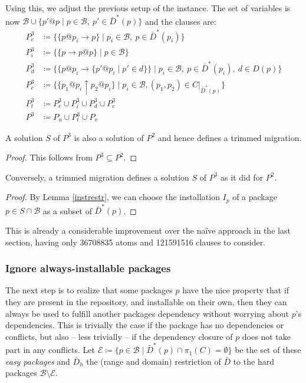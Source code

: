 \documentclass[halfparskip,11pt]{scrartcl}
\begin{document}
Using this, we adjust the previous setup of the instance. The set of variables is now $\mathcal B \cup \{p'@p \mid p \in \mathcal B,\  p'\in \bar D^*(p)\}$ and the clauses are: 
\begin{align*}
P^3_e &\coloneqq \{ \{p@p_i \to p\} \mid p_i \in\mathcal B,\ p\in \bar D^*(p_i)\} \\
P^3_i &\coloneqq \{ \{p \to  p@p\} \mid p \in\mathcal B\} \\
P^3_d &\coloneqq \{ \{p@p_i \to \{p'@p_i \mid p'\in d\}\} \mid p_i\in \mathcal B,\ p\in \bar D^*(p_i),\ d \in D(p)\}\\
P^3_c &\coloneqq \{ \{p_1@p_i \uparrow p_2@p_i\} \mid p_i\in \mathcal B, (p_1,p_2)\in C|_{\bar D^*(p)}\}\\
P^3_t &\coloneqq P^3_e \cup P^3_i \cup P^3_d \cup P^3_c \\
P^3 &\coloneqq P_u \cup P^3_t \cup P_v
\end{align*}

A solution $S$ of $P^3$ is also a solution of $P^2$ and hence defines a trimmed migration.
\begin{proof}
This follows from $P^3 \subseteq P^2$.
\end{proof}

Conversely, a trimmed migration defines a solution $S$ of $P^3$ as it did for $P^2$.

\begin{proof}
By Lemma \ref{instrestr}, we can choose the installation $I_p$ of a package $p\in S\cap \mathcal B$ as a subset of $\bar D^*(p)$.
\end{proof}

This is already a considerable improvement over the naïve approach in the last section, having only 36708835 atoms and 121591516 clauses to consider.

\subsubsection{Ignore always-installable packages}

The next step is to realize that some packages $p$ have the nice property that if they are present in the repository, and installable on their own, then they can always be used to fulfill another packages dependency without worrying about $p$’s dependencies. This is trivially the case if the package has no dependencies or conflicts, but also – less trivially – if the dependency closure of $p$ does not take part in any conflicts. Let $\mathcal E \coloneqq \{ p\in \mathcal B \mid  \bar D^*(p) \cap \pi_1(C) = \emptyset \}$ be the set of these \emph{easy packages} and $\bar D_h$ the (range and domain) restriction of $\bar D$ to the hard packages $\mathcal B\setminus \mathcal E$.
\end{document}

